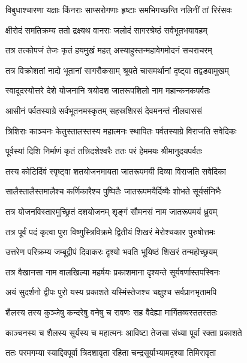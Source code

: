 \twolineshloka
{विबुधाश्चारणा यक्षाः किंनराः साप्सरोगणाः}
{हृष्टाः समभिगच्छन्ति नलिनीं तां रिरंसवः} %

\twolineshloka
{क्षीरोदं समतिक्रम्य ततो द्रक्ष्यथ वानराः}
{जलोदं सागरश्रेष्ठं सर्वभूतभयावहम्} %

\twolineshloka
{तत्र तत्कोपजं तेजः कृतं हयमुखं महत्}
{अस्याहुस्तन्महावेगमोदनं सचराचरम्} %

\twolineshloka
{तत्र विक्रोशतां नादो भूतानां सागरौकसाम्}
{श्रूयते चासमर्थानां दृष्ट्वा तद्वडवामुखम्} %

\twolineshloka
{स्वादूदस्योत्तरे देशे योजनानि त्रयोदश}
{जातरूपशिलो नाम महान्कनकपर्वतः} %

\twolineshloka
{आसीनं पर्वतस्याग्रे सर्वभूतनमस्कृतम्}
{सहस्रशिरसं देवमनन्तं नीलवाससं} %

\twolineshloka
{त्रिशिराः काञ्चनः केतुस्तालस्तस्य महात्मनः}
{स्थापितः पर्वतस्याग्रे विराजति सवेदिकः} %

\twolineshloka
{पूर्वस्यां दिशि निर्माणं कृतं तत्त्रिदशेश्वरैः}
{ततः परं हेममयः श्रीमानुदयपर्वतः} %

\twolineshloka
{तस्य कोटिर्दिवं स्पृष्ट्वा शतयोजनमायता}
{जातरूपमयी दिव्या विराजति सवेदिका} %

\twolineshloka
{सालैस्तालैस्तमालैश्च कर्णिकारैश्च पुष्पितैः}
{जातरूपमयैर्दिव्यैः शोभते सूर्यसंनिभैः} %

\twolineshloka
{तत्र योजनविस्तारमुच्छ्रितं दशयोजनम्}
{शृङ्गं सौमनसं नाम जातरूपमयं ध्रुवम्} %

\twolineshloka
{तत्र पूर्वं पदं कृत्वा पुरा विष्णुस्त्रिविक्रमे}
{द्वितीयं शिखरं मेरोश्चकार पुरुषोत्तमः} %

\twolineshloka
{उत्तरेण परिक्रम्य जम्बूद्वीपं दिवाकरः}
{दृश्यो भवति भूयिष्ठं शिखरं तन्महोच्छ्रयम्} %

\twolineshloka
{तत्र वैखानसा नाम वालखिल्या महर्षयः}
{प्रकाशमाना दृश्यन्ते सूर्यवर्णास्तपस्विनः} %

\twolineshloka
{अयं सुदर्शनो द्वीपः पुरो यस्य प्रकाशते}
{यस्मिंस्तेजश्च चक्षुश्च सर्वप्रानभृतामपि} %

\twolineshloka
{शैलस्य तस्य कुञ्जेषु कन्दरेषु वनेषु च}
{रावणः सह वैदेह्या मार्गितव्यस्ततस्ततः} %

\twolineshloka
{काञ्चनस्य च शैलस्य सूर्यस्य च महात्मनः}
{आविष्टा तेजसा संध्या पूर्वा रक्ता प्रकाशते} %

\twolineshloka
{ततः परमगम्या स्याद्दिक्पूर्वा त्रिदशावृता}
{रहिता चन्द्रसूर्याभ्यामदृश्या तिमिरावृता} %

